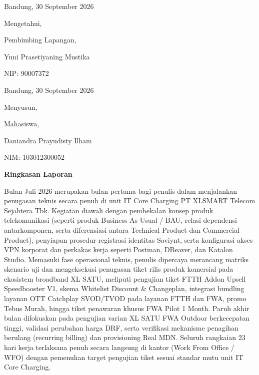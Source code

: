 \documentclass[12pt,a4paper]{article}
\begin{document}
\vspace{5.0cm}
\noindent
\begin{minipage}[t]{0.45\textwidth}
    \centering
    Bandung, 30 September 2026\par
    Mengetahui,\par
    Pembimbing Lapangan,\par
    \vspace{3.0cm}
    Yuni Prasetiyaning Mustika\par
    NIP: 90007372
\end{minipage}
\hfill
\begin{minipage}[t]{0.45\textwidth}
    \centering
    Bandung, 30 September 2026\par
    Menyusun,\par
    Mahasiswa,\par
    \vspace{3.0cm}
    Daniandra Prayudisty Ilham\par
    NIM: 103012300052
\end{minipage}

\clearpage
\setcounter{page}{2}

\begin{center}
    {\bfseries\large Ringkasan Laporan\par}
\end{center}
\vspace{0.8cm}

Bulan Juli 2026 merupakan bulan pertama bagi penulis dalam menjalankan penugasan teknis secara penuh di unit IT Core Charging PT XLSMART Telecom Sejahtera Tbk. Kegiatan diawali dengan pembekalan konsep produk telekomunikasi (seperti produk Business As Usual / BAU, relasi dependensi antarkomponen, serta diferensiasi antara Technical Product dan Commercial Product), penyiapan prosedur registrasi identitas Saviynt, serta konfigurasi akses VPN korporat dan perkakas kerja seperti Postman, DBeaver, dan Katalon Studio. Memasuki fase operasional teknis, penulis dipercaya merancang matriks skenario uji dan mengeksekusi penugasan tiket rilis produk komersial pada ekosistem broadband XL SATU, meliputi pengujian tiket FTTH Addon Upsell Speedbooster V1, skema Whitelist Discount \& Changeplan, integrasi bundling layanan OTT Catchplay SVOD/TVOD pada layanan FTTH dan FWA, promo Tebus Murah, hingga tiket penawaran khusus FWA Pilot 1 Month. Paruh akhir bulan difokuskan pada pengujian varian XL SATU FWA Outdoor berkecepatan tinggi, validasi perubahan harga DRF, serta verifikasi mekanisme penagihan berulang (recurring billing) dan provisioning Real MDN. Seluruh rangkaian 23 hari kerja terlaksana penuh secara langsung di kantor (Work From Office / WFO) dengan pemenuhan target pengujian tiket sesuai standar mutu unit IT Core Charging.
\end{document}
